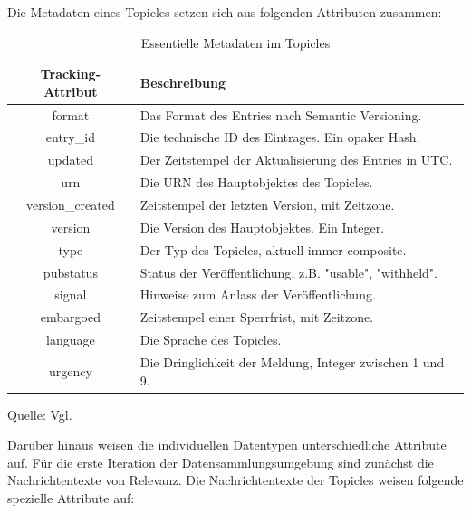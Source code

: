 Die Metadaten eines Topicles setzen sich aus folgenden Attributen zusammen:
\begin{table}[H]
    \centering
    \caption{Essentielle Metadaten im Topicles}
    \label{tab:Essentielle Metadaten im Topicles}
    \begin{tabular}{|c|p{11cm}|} \hline         
        \textbf{Tracking-Attribut} & \textbf{Beschreibung} \\ \hline 
            format                  & Das Format des Entries nach Semantic Versioning.           \\ \hline
            entry\_id               & Die technische ID des Eintrages. Ein opaker Hash.          \\ \hline
            updated                 & Der Zeitstempel der Aktualisierung des Entries in UTC.     \\ \hline
            urn                     & Die URN des Hauptobjektes des Topicles.                    \\ \hline
            version\_created        & Zeitstempel der letzten Version, mit Zeitzone.             \\ \hline
            version                 & Die Version des Hauptobjektes. Ein Integer.                \\ \hline
            type                    & Der Typ des Topicles, aktuell immer composite.             \\ \hline
            pubstatus               & Status der Veröffentlichung, z.B. "usable", "withheld".    \\ \hline
            signal                  & Hinweise zum Anlass der Veröffentlichung.                  \\ \hline
            embargoed               & Zeitstempel einer Sperrfrist, mit Zeitzone.                \\ \hline
            language                & Die Sprache des Topicles.                                  \\ \hline
            urgency                 & Die Dringlichkeit der Meldung, Integer zwischen 1 und 9.   \\ \hline
    \end{tabular}

    Quelle: Vgl. 
\end{table}

Darüber hinaus weisen die individuellen Datentypen unterschiedliche Attribute auf. Für die erste Iteration der Datensammlungsumgebung sind zunächst die Nachrichtentexte von Relevanz. 
Die Nachrichtentexte der Topicles weisen folgende spezielle Attribute auf:

